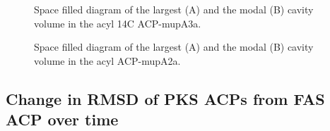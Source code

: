 \begin{singlespacing}
		\setlength\fboxsep{5pt}
		\setlength\fboxrule{1.5pt}
		\begin{figure}[htbp]
		\centering
		\caption[Space filled diagram of the largest and the modal cavity volume in the acyl 14C ACP-mupA3a.]{Space filled diagram of the largest (A) and the modal (B) cavity volume in the acyl 14C ACP-mupA3a.}
		\label{fig:spd}
		\end{figure}

		\setlength\fboxsep{5pt}
		\setlength\fboxrule{1.5pt}
		\begin{figure}[htbp]
		\centering
		\caption[Space filled diagram of the largest and the modal cavity volume in the acyl ACP-mupA2a.]{Space filled diagram of the largest (A) and the modal (B) cavity volume in the acyl ACP-mupA2a.}
		\label{fig:acp2}
		\end{figure}

								
		
\newpage
	\subsection{Change in RMSD of PKS ACPs from FAS ACP over time}
	\label{sec:AppIII:rmsd}	
	

\end{singlespacing}
